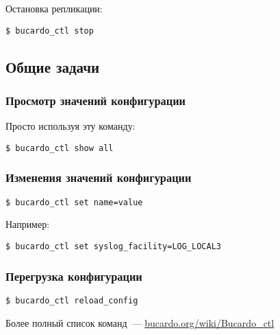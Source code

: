 Остановка репликации:
\begin{lstlisting}[label=lst:bucardo12,caption=Остановка репликации]
$ bucardo_ctl stop
\end{lstlisting}

\subsection{Общие задачи}

\subsubsection{Просмотр значений конфигурации}
Просто используя эту команду:
\begin{lstlisting}[label=lst:bucardo13,caption=Просмотр значений конфигурации]
$ bucardo_ctl show all
\end{lstlisting}

\subsubsection{Изменения значений конфигурации}
\begin{lstlisting}[label=lst:bucardo14,caption=Изменения значений конфигурациии]
$ bucardo_ctl set name=value
\end{lstlisting}

Например:
\begin{lstlisting}[label=lst:bucardo15,caption=Изменения значений конфигурации]
$ bucardo_ctl set syslog_facility=LOG_LOCAL3
\end{lstlisting}

\subsubsection{Перегрузка конфигурации}
\begin{lstlisting}[label=lst:bucardo16,caption=Перегрузка конфигурации]
$ bucardo_ctl reload_config
\end{lstlisting}

Более полный список команд~--- \href{http://bucardo.org/wiki/Bucardo\_ctl}{bucardo.org/wiki/Bucardo\_ctl}


